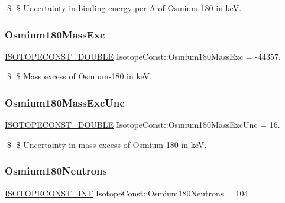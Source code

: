 \$ \$ Uncertainty in binding energy per A of Osmium-\/180 in keV. \mbox{\label{group___isotope_const-_osmium-_os180_gaef391898f3a5bc2cf0cf47e62c1d7d26}} 
\subsubsection{\texorpdfstring{Osmium180\+Mass\+Exc}{Osmium180MassExc}}
{\footnotesize\ttfamily \mbox{\hyperlink{group___isotope_const-_macros_ga8f45a7272ce02c0b4c65c44636ed719a}{I\+S\+O\+T\+O\+P\+E\+C\+O\+N\+S\+T\+\_\+\+D\+O\+U\+B\+LE}} Isotope\+Const\+::\+Osmium180\+Mass\+Exc = -\/44357.}

\$ \$ Mass excess of Osmium-\/180 in keV. \mbox{\label{group___isotope_const-_osmium-_os180_ga69f2d8edef8cc2b2a4da3aa32efa53f3}} 
\subsubsection{\texorpdfstring{Osmium180\+Mass\+Exc\+Unc}{Osmium180MassExcUnc}}
{\footnotesize\ttfamily \mbox{\hyperlink{group___isotope_const-_macros_ga8f45a7272ce02c0b4c65c44636ed719a}{I\+S\+O\+T\+O\+P\+E\+C\+O\+N\+S\+T\+\_\+\+D\+O\+U\+B\+LE}} Isotope\+Const\+::\+Osmium180\+Mass\+Exc\+Unc = 16.}

\$ \$ Uncertainty in mass excess of Osmium-\/180 in keV. \mbox{\label{group___isotope_const-_osmium-_os180_gaa1cd960826cf1d2667b941c49c7b88a2}} 
\subsubsection{\texorpdfstring{Osmium180\+Neutrons}{Osmium180Neutrons}}
{\footnotesize\ttfamily \mbox{\hyperlink{group___isotope_const-_macros_ga5f18360b3e99483a35c32d789e62621c}{I\+S\+O\+T\+O\+P\+E\+C\+O\+N\+S\+T\+\_\+\+I\+NT}} Isotope\+Const\+::\+Osmium180\+Neutrons = 104}

